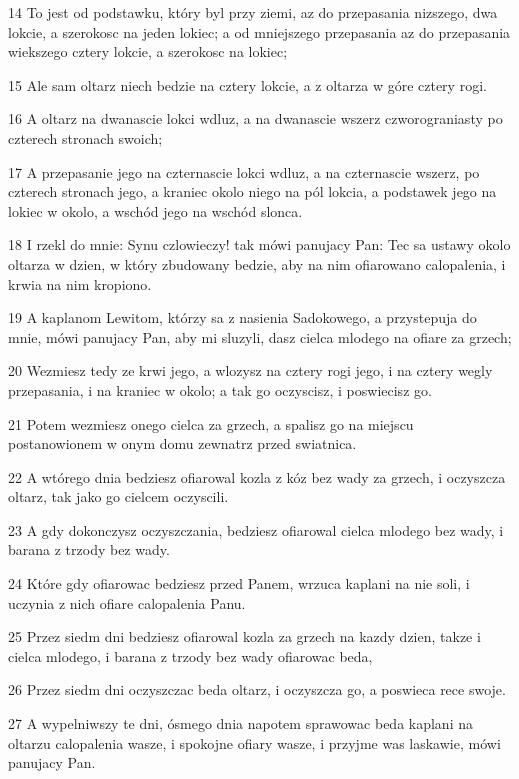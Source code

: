 \par 14 To jest od podstawku, który byl przy ziemi, az do przepasania nizszego, dwa lokcie, a szerokosc na jeden lokiec; a od mniejszego przepasania az do przepasania wiekszego cztery lokcie, a szerokosc na lokiec;
\par 15 Ale sam oltarz niech bedzie na cztery lokcie, a z oltarza w góre cztery rogi.
\par 16 A oltarz na dwanascie lokci wdluz, a na dwanascie wszerz czworograniasty po czterech stronach swoich;
\par 17 A przepasanie jego na czternascie lokci wdluz, a na czternascie wszerz, po czterech stronach jego, a kraniec okolo niego na pól lokcia, a podstawek jego na lokiec w okolo, a wschód jego na wschód slonca.
\par 18 I rzekl do mnie: Synu czlowieczy! tak mówi panujacy Pan: Tec sa ustawy okolo oltarza w dzien, w który zbudowany bedzie, aby na nim ofiarowano calopalenia, i krwia na nim kropiono.
\par 19 A kaplanom Lewitom, którzy sa z nasienia Sadokowego, a przystepuja do mnie, mówi panujacy Pan, aby mi sluzyli, dasz cielca mlodego na ofiare za grzech;
\par 20 Wezmiesz tedy ze krwi jego, a wlozysz na cztery rogi jego, i na cztery wegly przepasania, i na kraniec w okolo; a tak go oczyscisz, i poswiecisz go.
\par 21 Potem wezmiesz onego cielca za grzech, a spalisz go na miejscu postanowionem w onym domu zewnatrz przed swiatnica.
\par 22 A wtórego dnia bedziesz ofiarowal kozla z kóz bez wady za grzech, i oczyszcza oltarz, tak jako go cielcem oczyscili.
\par 23 A gdy dokonczysz oczyszczania, bedziesz ofiarowal cielca mlodego bez wady, i barana z trzody bez wady.
\par 24 Które gdy ofiarowac bedziesz przed Panem, wrzuca kaplani na nie soli, i uczynia z nich ofiare calopalenia Panu.
\par 25 Przez siedm dni bedziesz ofiarowal kozla za grzech na kazdy dzien, takze i cielca mlodego, i barana z trzody bez wady ofiarowac beda,
\par 26 Przez siedm dni oczyszczac beda oltarz, i oczyszcza go, a poswieca rece swoje.
\par 27 A wypelniwszy te dni, ósmego dnia napotem sprawowac beda kaplani na oltarzu calopalenia wasze, i spokojne ofiary wasze, i przyjme was laskawie, mówi panujacy Pan.

